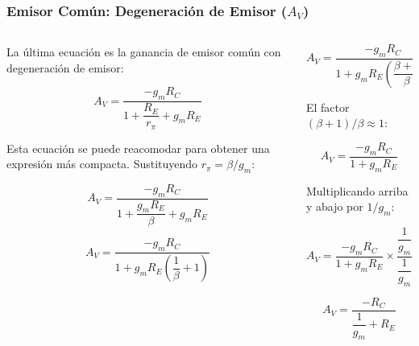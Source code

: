 \begin{frame}[t]
    \frametitle{Emisor Común: Degeneración de Emisor ($A_V$)}

    \begin{columns}
        \begin{column}{0.5\textwidth}
            La última ecuación es la ganancia de emisor común con degeneración de emisor:
            
            \[ A_V = \dfrac{-g_m R_C}{1 + \dfrac{R_E}{r_\pi} + g_m R_E} \]

            Esta ecuación se puede reacomodar para obtener una expresión más compacta. Sustituyendo $r_\pi = \beta / g_m$:

            \[ A_V = \dfrac{-g_m R_C}{1 + \dfrac{g_m R_E}{\beta} + g_m R_E} \]

            \[ A_V = \dfrac{-g_m R_C}{1 + g_m R_E \left( \dfrac{1}{\beta} + 1 \right) } \]
        \end{column}
        \begin{column}{0.5\textwidth}
            \[ A_V = \dfrac{-g_m R_C}{1 + g_m R_E \left( \dfrac{\beta+1}{\beta} \right) } \]

            El factor $(\beta+1)/\beta \approx 1$:

            \[ A_V = \dfrac{-g_m R_C}{1 + g_m R_E } \]

            Multiplicando arriba y abajo por $1/g_m$:

            \[ A_V = \dfrac{-g_m R_C}{1 + g_m R_E } \times \dfrac{\dfrac{1}{g_m}}{\dfrac{1}{g_m}} \]

            \[ \boxed{A_V = \dfrac{- R_C}{\dfrac{1}{g_m} + R_E }} \]
        \end{column}
    \end{columns}
\end{frame}

